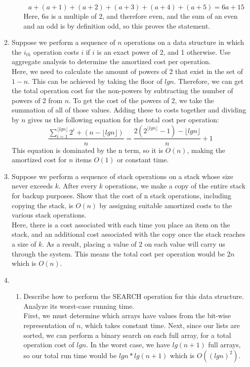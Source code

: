 \documentclass{article}
\begin{document}
\begin{enumerate}
\begin{enumerate}[label=(\alph*)]
\begin{equation}
            a + (a + 1) + (a + 2) + (a + 3) + (a + 4) + (a + 5) = 6a + 15
        \end{equation}
        Here, \(6a\) is a multiple of 2, and therefore even, and the sum of an even and an odd is by definition odd, so this proves the statement.
    \end{enumerate}
\clearpage
\item
    Suppose we perform a sequence of \(n\) operations on a data structure in which the \(i_{th}\) operation costs \(i\) if \(i\) is an exact power of 2, and 1 otherwise. Use aggregate analysis to determine the amortized cost per operation.
    \\[\medskipamount]
    Here, we need to calculate the amount of powers of 2 that exist in the set of \(1-n\). This can be achieved by taking the floor of \(lgn\). Therefore, we can get the total operation cost for the non-powers by subtracting the number of powers of 2 from \(n\). To get the cost of the powers of 2, we take the summation of all of those values. Adding these to costs together and dividing by \(n\) gives us the following equation for the total cost per operation:
        \begin{equation}
            \frac{\sum_{i = 1}^{\lfloor lgn \rfloor} 2^i + (n - \lfloor lgn \rfloor)}{n} = \frac{2(2^{\lfloor lgn \rfloor} - 1) - \lfloor lgn \rfloor}{n} + 1
        \end{equation}
    This equation is dominated by the n term, so it is \(O(n)\), making the amortized cost for \(n\) items \(O(1)\) or constant time.
    
\item 
    Suppose we perform a sequence of stack operations on a stack whose size never exceeds \(k\). After every \(k\) operations, we make a copy of the entire stack for backup purposes. Show that the cost of n stack operations, including copying the stack, is \(O(n)\) by assigning suitable amortized costs to the various stack operations.
    \\[\medskipamount]
    Here, there is a cost associated with each time you place an item on the stack, and an additional cost associated with the copy once the stack reaches a size of \(k\). As a result, placing a value of 2 on each value will carry us through the system. This means the total cost per operation would be \(2n\) which is \(O(n)\).

\item

\begin{enumerate}[label=(\alph*)]
        \item Describe how to perform the SEARCH operation for this data structure. Analyze its worst-case running time.
        \\[\medskipamount]
        First, we must determine which arrays have values from the bit-wise representation of \(n\), which takes constant time. Next, since our lists are sorted, we can perform a binary search on each full array, for a total operation cost of \(lgn\). In the worst case, we have \(lg(n+1)\) full arrays, so our total run time would be \(lgn * lg(n+1)\) which is \(O((lgn)^2)\).
        

\end{enumerate}
\end{enumerate}
\end{document}
